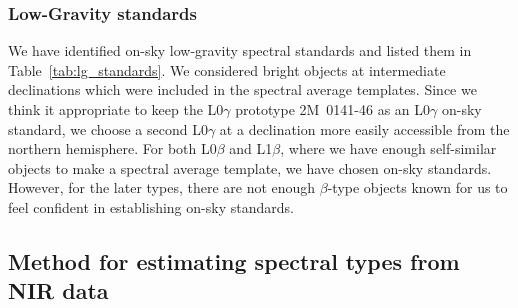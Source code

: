 \documentclass[12pt,preprint]{aastex}
\begin{document}

\subsubsection{Low-Gravity standards}

We have identified on-sky low-gravity spectral standards and listed them in Table~\ref{tab:lg_standards}.
We considered bright objects at intermediate declinations which were included in the spectral average templates. 
Since we think it appropriate to keep the L0$\gamma$ prototype 2M~0141-46 as an L0$\gamma$ on-sky standard, we choose a second L0$\gamma$ at a declination more easily accessible from the northern hemisphere. For both L0$\beta$ and L1$\beta$, where we have enough self-similar objects to make a spectral average template, we have chosen on-sky standards.
However, for the later types, there are not enough $\beta$-type objects known for us to feel confident in establishing on-sky standards.



\subsection{Method for estimating spectral types from NIR data}
\end{document}
